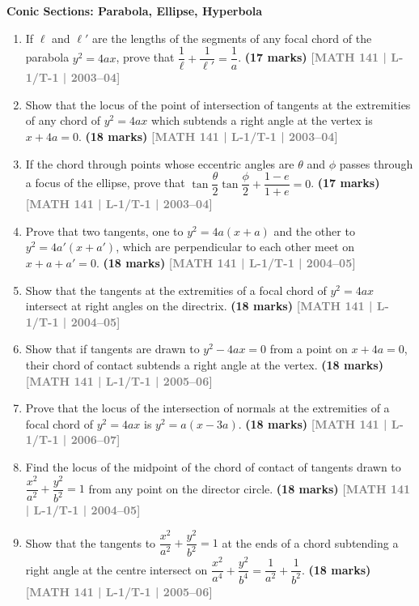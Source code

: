 \documentclass[12pt,a4paper]{article}
\newcommand{\yr}[1]{\hfill\textcolor{gray}{\small\textbf{[#1]}}}
\newcommand{\mk}[1]{\textcolor{orange!70!black}{\small\textbf{(#1 marks)}}}
\newcommand{\subtopic}[2]{%
  \vspace{10pt}
  \noindent\begin{tcolorbox}[colback=#1!8,colframe=#1,boxrule=0.6pt,arc=4pt,
    left=6pt,right=6pt,top=4pt,bottom=4pt]
    \small\bfseries\textcolor{#1}{#2}
  \end{tcolorbox}
  \vspace{2pt}
}
\begin{document}
\subtopic{cH}{Conic Sections: Parabola, Ellipse, Hyperbola}
\label{sub:s10-conics}

\begin{enumerate}

\item If $\ell$ and $\ell'$ are the lengths of the segments of any focal chord of the parabola $y^{2}=4ax$, prove that $\dfrac{1}{\ell}+\dfrac{1}{\ell'}=\dfrac{1}{a}$.
\mk{17} \yr{MATH 141 | L-1/T-1 | 2003--04}

\item Show that the locus of the point of intersection of tangents at the extremities of any chord of $y^{2}=4ax$ which subtends a right angle at the vertex is $x+4a=0$.
\mk{18} \yr{MATH 141 | L-1/T-1 | 2003--04}

\item If the chord through points whose eccentric angles are $\theta$ and $\phi$ passes through a focus of the ellipse, prove that $\tan\dfrac{\theta}{2}\tan\dfrac{\phi}{2}+\dfrac{1-e}{1+e}=0$.
\mk{17} \yr{MATH 141 | L-1/T-1 | 2003--04}

\item Prove that two tangents, one to $y^{2}=4a(x+a)$ and the other to $y^{2}=4a'(x+a')$, which are perpendicular to each other meet on $x+a+a'=0$.
\mk{18} \yr{MATH 141 | L-1/T-1 | 2004--05}

\item Show that the tangents at the extremities of a focal chord of $y^{2}=4ax$ intersect at right angles on the directrix.
\mk{18} \yr{MATH 141 | L-1/T-1 | 2004--05}

\item Show that if tangents are drawn to $y^{2}-4ax=0$ from a point on $x+4a=0$, their chord of contact subtends a right angle at the vertex.
\mk{18} \yr{MATH 141 | L-1/T-1 | 2005--06}

\item Prove that the locus of the intersection of normals at the extremities of a focal chord of $y^{2}=4ax$ is $y^{2}=a(x-3a)$.
\mk{18} \yr{MATH 141 | L-1/T-1 | 2006--07}

\item Find the locus of the midpoint of the chord of contact of tangents drawn to $\dfrac{x^{2}}{a^{2}}+\dfrac{y^{2}}{b^{2}}=1$ from any point on the director circle.
\mk{18} \yr{MATH 141 | L-1/T-1 | 2004--05}

\item Show that the tangents to $\dfrac{x^{2}}{a^{2}}+\dfrac{y^{2}}{b^{2}}=1$ at the ends of a chord subtending a right angle at the centre intersect on $\dfrac{x^{2}}{a^{4}}+\dfrac{y^{2}}{b^{4}}=\dfrac{1}{a^{2}}+\dfrac{1}{b^{2}}$.
\mk{18} \yr{MATH 141 | L-1/T-1 | 2005--06}


\end{enumerate}
\end{document}
